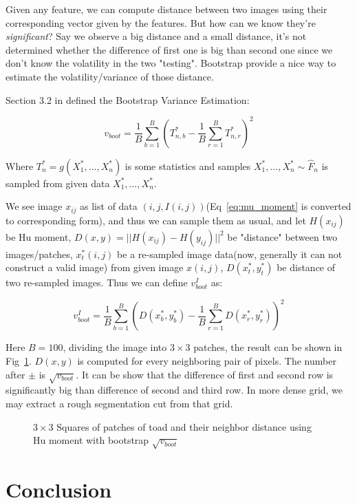 \documentclass{article}
\begin{document}
Given any feature, we can compute distance between two images using their corresponding vector given by the features. But how can we know
they're \textit{significant}? Say we observe a big distance and a small distance, it's not determined whether the difference of first one is 
big than second one since we don't know the volatility in the two "testing". Bootstrap provide a nice way to estimate the volatility/variance
of those distance.

Section 3.2 in \cite{wasserman2006all} defined the Bootstrap Variance Estimation:

$$
v_{boot} = \frac{1}{B} \sum_{b=1}^B \left( T^*_{n,b} - \frac{1}{B}\sum_{r=1}^B T^*_{n,r} \right)^2
$$

Where $T_n^*=g(X_1^*,\dots,X_n^*)$ is some statistics and samples $X_1^*,\dots,X_n^* \sim \hat{F}_n$ is sampled from given data $X_1^*,\dots,X_n^*$.

We see image $x_{ij}$ as list of data $(i,j,I(i,j))$(Eq~\ref{eq:mu_moment} is converted to corresponding form), and thus we can sample them as usual,
and let $H(x_{ij})$ be Hu moment, $D(x,y)=||H(x_{ij}) - H(y_{ij})||^2$ be "distance" between two images/patches, $x_t^*(i,j)$ be a re-sampled
image data(now, generally it can not construct a valid image) from given image $x(i,j)$, $D(x_t^*,y_t^*)$ be distance of two re-sampled images. Thus we can define $v_{boot}^I$ as:

$$
v_{boot}^I = \frac{1}{B}\sum_{b=1}^B \left( D(x_b^*,y_b^*) - \frac{1}{B} \sum_{r=1}^B D(x_r^*,y_r^*) \right)^2
$$

Here $B=100$, dividing the image into $3 \times 3$ patches, the result can be shown in Fig~\ref{fig:square33}. 
$D(x,y)$ is computed for every neighboring pair of pixels. The number after $\pm$ is $\sqrt{v_{boot}}$. It can be show that
the difference of first and second row is significantly big than difference of second and third row. In more dense grid,
we may extract a rough segmentation cut from that grid.

\begin{figure}[htb]
  \centering
  
  \caption{$3 \times 3$ Squares of patches of toad and their neighbor distance using Hu moment with bootstrap $\sqrt{v_{boot}}$}
  \label{fig:square33}
\end{figure}

\section{Conclusion}
\end{document}
